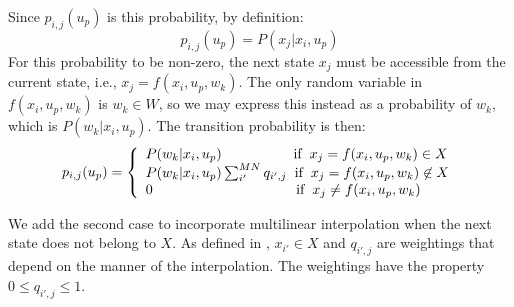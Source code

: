 \documentclass[conference]{IEEEtran}
\begin{document}
Since $p_{i,j}(u_{p})$ is this probability, by definition: 
\begin{displaymath}
p_{i,j}(u_{p})= P(x_{j}| x_{i},u_{p})
\end{displaymath} For this probability to be non-zero, the next state $x_{j}$ must be accessible from the current state, i.e., $x_{j}=f(x_{i},u_{p},w_{k})$. %
The only random variable in $f(x_{i},u_{p},w_{k})$ is $w_{k}\in W$, so we may express this instead as a probability of $w_{k}$, which is $P(w_{k} | x_{i},u_{p})$. The transition probability is then:
\begin{equation} \label{eq:TransMtx}
p_{i,j}(u_{p})=
\left\{
\begin{array}{l}
P(w_{k}|x_{i},u_{p}) \hspace{1.8cm} \text{if} \hspace{0.2cm} x_{j}=f(x_{i},u_{p},w_{k})\in X\\
P(w_{k}|x_{i},u_{p})\sum_{i'}^{MN}q_{i',j} \hspace{0.2cm} \text{if} \hspace{0.2cm} x_{j}=f(x_{i},u_{p},w_{k})\not\in X\\
0 \hspace{3.6cm} \text{if} \hspace{0.2cm} x_{j}\neq f(x_{i},u_{p},w_{k})
\end{array}
\right.
\end{equation}

We add the second case to incorporate multilinear interpolation when the next state does not belong to $X$. As defined in \cite{715376}, $x_{i'}\in X$ and $q_{i',j}$ are weightings that depend on the manner of the interpolation. The weightings have the property $0\leq q_{i',j}\leq 1$.
\end{document}
